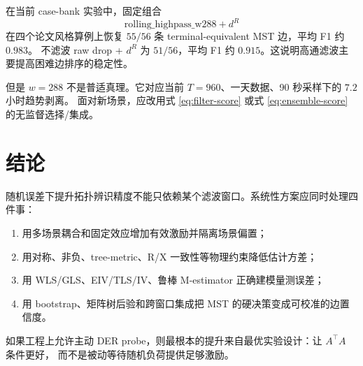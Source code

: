 \documentclass[UTF8,11pt]{ctexart}
\begin{document}
在当前 case-bank 实验中，固定组合
\[
    \text{rolling\_highpass\_w288}+d^R
\]
在四个论文风格算例上恢复 $55/56$ 条 terminal-equivalent MST 边，平均 F1 约 $0.983$。
不滤波 raw drop + $d^R$ 为 $51/56$，平均 F1 约 $0.915$。这说明高通滤波主要提高困难边排序的稳定性。

但是 $w=288$ 不是普适真理。它对应当前 $T=960$、一天数据、90 秒采样下的 $7.2$ 小时趋势剥离。
面对新场景，应改用式 \eqref{eq:filter-score} 或式 \eqref{eq:ensemble-score} 的无监督选择/集成。

\section{结论}

随机误差下提升拓扑辨识精度不能只依赖某个滤波窗口。系统性方案应同时处理四件事：

\begin{enumerate}[leftmargin=2em]
  \item 用多场景耦合和固定效应增加有效激励并隔离场景偏置；
  \item 用对称、非负、tree-metric、R/X 一致性等物理约束降低估计方差；
  \item 用 WLS/GLS、EIV/TLS/IV、鲁棒 M-estimator 正确建模量测误差；
  \item 用 bootstrap、矩阵树后验和跨窗口集成把 MST 的硬决策变成可校准的边置信度。
\end{enumerate}

如果工程上允许主动 DER probe，则最根本的提升来自最优实验设计：让 $A^\top A$ 条件更好，
而不是被动等待随机负荷提供足够激励。
\end{document}
